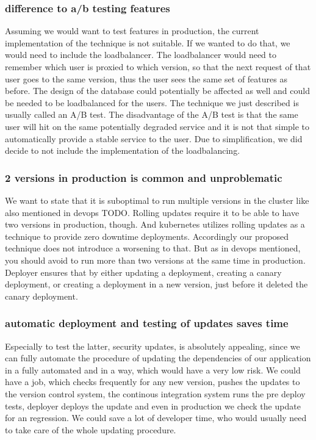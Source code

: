 \subsubsection{difference to a/b testing features}
Assuming we would want to test features in production, the current implementation of the
technique is not suitable. If we wanted to do that, we would need to include the
loadbalancer. The loadbalancer would need to remember which user is proxied to which
version, so that the next request of that user goes to the same version, thus the user
sees the same set of features as before. The design of the database could potentially be
affected as well and could be needed to be loadbalanced for the users. The technique we
just described is usually called an A/B test. The disadvantage of the A/B test is that the
same user will hit on the same potentially degraded service and it is not that simple to
automatically provide a stable service to the user. Due to simplification, we did decide
to not include the implementation of the loadbalancing.

\subsubsection{2 versions in production is common and unproblematic}
We want to state that it is suboptimal to run multiple versions in the cluster like also
mentioned in devops TODO. Rolling updates require it to be able to have two versions in
production, though. And kubernetes utilizes rolling updates as a technique to provide zero
downtime deployments. Accordingly our proposed technique does not introduce a worsening to
that. But as in devops mentioned, you should avoid to run more than two versions at the
same time in production. Deployer ensures that by either updating a deployment, creating a
canary deployment, or creating a deployment in a new version, just before it deleted the
canary deployment.

\subsubsection{automatic deployment and testing of updates saves time}
Especially to test the latter, security updates, is absolutely appealing, since we can
fully automate the procedure of updating the dependencies of our application in a fully
automated and in a way, which would have a very low risk. We could have a job, which
checks frequently for any new version, pushes the updates to the version control system,
the continous integration system runs the pre deploy tests, deployer deploys the update
and even in production we check the update for an regression. We could save a lot of
developer time, who would usually need to take care of the whole updating procedure.

